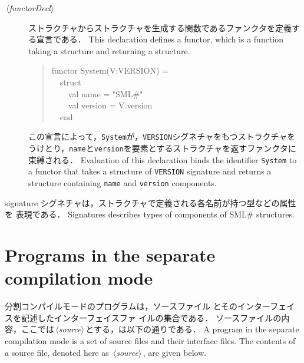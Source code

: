 \documentclass{jbook}
\newcommand{\txt}[2]{#2}
\newcommand{\smlsharp}{SML\#}
\newcommand{\code}[1]{\mbox{\large\tt #1}}
\newcommand{\nonterm}[1]{\mbox{$\,\langle$}{\it #1}\mbox{$\rangle\,$}}
\newcommand{\myem}{\mbox{\ \ }}
\newenvironment{program}{\begin{quote}\begin{tt}}%
                        {\end{tt}\end{quote}}
\begin{document}
\begin{description}
\item[\nonterm{functorDecl}] 
\ifjp%
	ストラクチャからストラクチャを生成する関数であるファンクタを定義する宣言である．
\else%
	This declaration defines a functor, which is a function taking a
structure and returning a structure.
\fi%
\begin{program}
functor System(V:VERSION) =\\
\myem struct\\
\myem\myem val name = "SML\#"\\ 
\myem\myem val version = V.version\\
\myem end
\end{program}
\ifjp%
	この宣言によって，\code{System}が，\code{VERSION}シグネチャをもつストラクチャを
うけとり，\code{name}と\code{version}を要素とするストラクチャを返すファンクタに束縛される．
\else%
	Evaluation of this declaration binds the identifier
\code{System} to a functor that takes a structure of \code{VERSION}
signature and returns a structure containing \code{name} and
\code{version} components.
\fi%
\end{description}


\txt{シグネチャ}{signature}
\ifjp%
	シグネチャは，ストラクチャで定義される各名前が持つ型などの属性を
表現である．
\else%
	Signatures describes types of components of \smlsharp{} structures.
\fi%


\section{\txt{分割コンパイルモードのプログラム}{Programs in the separate compilation mode}}
\label{spec:sec:batchProgram}

\ifjp%
	分割コンパイルモードのプログラムは，ソースファイル
とそのインターフェイスを記述したインターフェイスファ
イルの集合である．
	ソースファイルの内容，ここでは\nonterm{source}とする，は以下の通りである．
\else%
	A program in the separate compilation mode is a set of source
files and their interface files.
	The contents of a source file, denoted here as
\nonterm{source}, are given below.
\fi%
\end{document}
